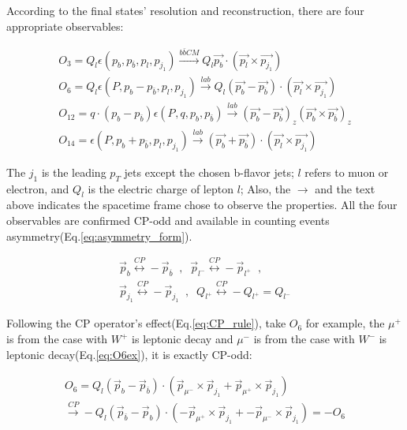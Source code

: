 		According to the final states' resolution and reconstruction, there are four appropriate observables:

		\begin{equation}
		\begin{split}
		O_3 = Q_l \epsilon(p_{b}, p_{\bar{b}}, p_{l}, p_{j_1}) \xrightarrow[\text{}]{b \bar{b} CM} Q_l \vec{p_{b}} \cdot ( \vec{p_l} \times \vec{p_{j_1}} ) \\
		O_{6} = Q_l \epsilon(P, p_{b}-p_{\bar{b}}, p_{l}, p_{j_1}) \xrightarrow[\text{}]{lab} Q_l (\vec{p_{b}} - \vec{p_{\overline{b}}}) \cdot ( \vec{p_l} \times \vec{p_{j_1}} ) \\
		O_{12} = q \cdot (p_{b}-p_{\bar{b}}) \epsilon(P_{}, q, p_{b}, p_{\bar{b}}) \xrightarrow[]{lab} (\vec{p_{b}} - \vec{p_{\overline{b}}})_z ( \vec{p_b} \times \vec{p_{\overline{b}}} )_z \\
		O_{14} = \epsilon(P, p_{b}+p_{\bar{b}}, p_{l}, p_{j_1}) \xrightarrow[]{lab} (\vec{p_{b}} + \vec{p_{\overline{b}}}) \cdot ( \vec{p_l} \times \vec{p_{j_1}} )
		\end{split}
		\label{eq:four_obs}
		\end{equation}
		\FloatBarrier

		The $j_1$ is the leading $p_T$ jets except the chosen b-flavor jets; $l$ refers to muon or electron, and $Q_l$ is the electric charge of lepton $l$; Also, the $\rightarrow$ and the text above indicates the spacetime frame chose to observe the properties. All the four observables are confirmed CP-odd and available in counting events asymmetry(Eq.\ref{eq:asymmetry_form}). 

		\begin{equation}
		\begin{split}
		\vec{p}_b \overset{CP}{\longleftrightarrow} -\vec{p}_{\overline{b}}\;\;, \;\; \vec{p}_{l^-} \overset{CP}{\longleftrightarrow} -\vec{p}_{l^+}\;\;,\;\;\;\;\;\; \\
		\vec{p}_{j_1} \overset{CP}{\longleftrightarrow} -\vec{p}_{j_1}\;\;, \;\; Q_{l^+} \overset{CP}{\longleftrightarrow} -Q_{l^+} = Q_{l^-}
		\label{eq:CP_rule}
		\end{split}
		\end{equation}
		\FloatBarrier

		Following the CP operator's effect(Eq.\ref{eq:CP_rule}), take $O_6$ for example, the $\mu^+$ is from the case with $W^+$ is leptonic decay and $\mu^-$ is from the case with $W^-$ is leptonic decay(Eq.\ref{eq:O6ex}), it is exactly CP-odd:

		\begin{equation}
		\begin{split}
		O_6 = Q_l (\vec{p}_b - \vec{p}_{\bar{b}}) \cdot (\vec{p}_{\mu^-} \times \vec{p}_{j_1} + \vec{p}_{\mu^+} \times \vec{p}_{j_1}) \\
		\xrightarrow[]{CP} -Q_l (\vec{p}_{\bar{b}} - \vec{p}_b) \cdot (-\vec{p}_{\mu^+} \times \vec{p}_{j_1} + -\vec{p}_{\mu^-} \times \vec{p}_{j_1}) = -O_6
		\label{eq:O6ex}
		\end{split}
		\end{equation}
		\FloatBarrier

